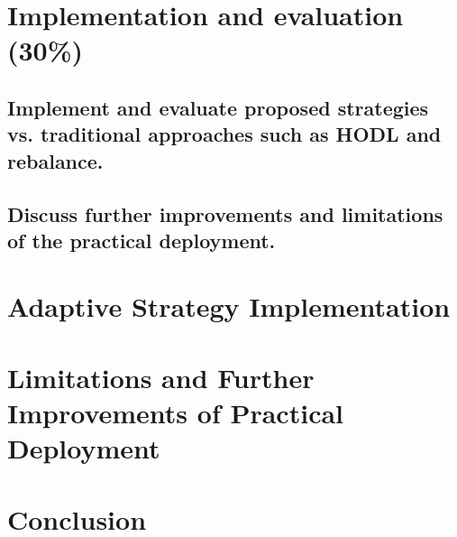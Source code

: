 \chapter{Implementation and evaluation (30\%)}
\section{Implement and evaluate proposed strategies vs. traditional approaches such as HODL and
rebalance.}
\section{Discuss further improvements and limitations of the practical deployment.}

\chapter{Adaptive Strategy Implementation}
\label{implementation}

\chapter{Limitations and Further Improvements of Practical Deployment}
\label{limitations}

\chapter{Conclusion}
\label{conclsion}
